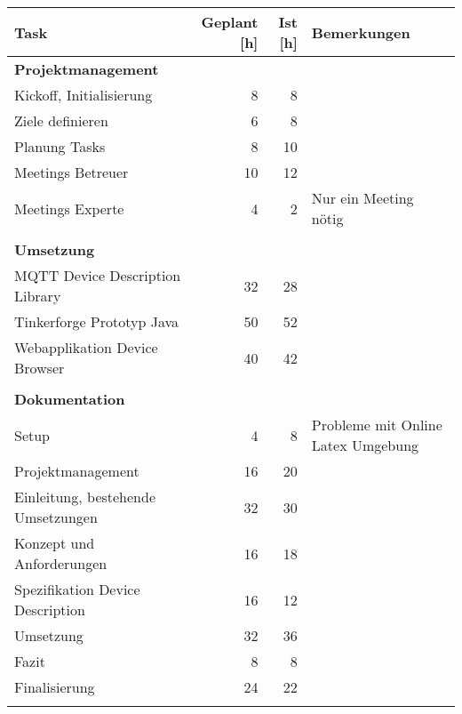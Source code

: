 \begin{table}[H]
\begin{tabularx}{\textwidth}{|l|r|r|X|}

 \hline \rowcolor{lightgray}
 {\bf Task } & { \bf Geplant [h] } & {\bf Ist [h] }  & {\bf Bemerkungen } \\  \hline
 \textbf{Projektmanagement}         &      &       &   \\ \hline
 Kickoff, Initialisierung           &   8  &   8   &   \\ \hline
 Ziele definieren                   &   6  &   8   &   \\ \hline
 Planung Tasks                      &   8  &  10   &   \\ \hline
 Meetings Betreuer                  &  10  &  12   &   \\ \hline
 Meetings Experte                   &   4  &   2   &  Nur ein Meeting nötig \\ \hline
     &      &       &   \\ \hline
 \textbf{Umsetzung}                 &      &       &   \\ \hline
 MQTT Device Description Library    &  32  &  28   &   \\ \hline
 Tinkerforge Prototyp Java          &  50  &  52   &   \\ \hline
 Webapplikation Device Browser      &  40  &  42   &   \\ \hline
     &      &       &   \\ \hline
 \textbf{Dokumentation}             &      &       &   \\ \hline
 Setup                              &   4  &   8   &  Probleme mit Online Latex Umgebung \\ \hline
 Projektmanagement                  &  16  &  20   &   \\ \hline
 Einleitung, bestehende Umsetzungen &  32  &  30   &   \\ \hline
 Konzept und Anforderungen          &  16  &  18   &   \\ \hline
 Spezifikation Device Description   &  16  &  12   &   \\ \hline
 Umsetzung                          &  32  &  36   &   \\ \hline
 Fazit                              &   8  &   8   &   \\ \hline
 Finalisierung                      &  24  &  22   &   \\ \hline
     &      &       &   \\ \hline

\end{tabularx}
\end{table}

